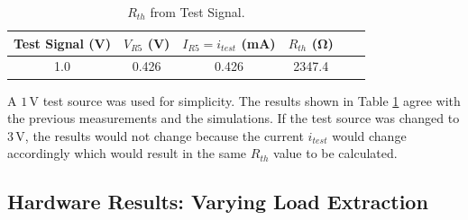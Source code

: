\documentclass[11pt]{article}
\begin{document}




\begin{table}[h!]
	\centering
	\caption{$R_{th}$ from Test Signal.}
	\label{Table:Lab3ReqTestSignal}
	\begin{tabular}{|c|c|c|c|c|c|}
		\hline
		Test Signal  (\si{\volt}) &$V_{R5}$ (\si{\volt}) & $I_{R5}=i_{test}$ (\si{\milli\ampere}) & $R_{th}$ (\si{\ohm})\\
		\hline
		1.0 & 0.426 & 0.426 & 2347.4 \\	 \hline 
	\end{tabular}
\end{table}

A $1\,\si\volt$ test source was used for simplicity. The results shown in Table \ref{Table:Lab3ReqTestSignal} agree with the previous measurements and the simulations. If the test source was changed to $3\,\si\volt$, the results would not change because the current $i_{test}$ would change accordingly which would result in the same $R_{th}$ value to be calculated.

\subsection{Hardware Results: Varying Load Extraction}

\end{document}
